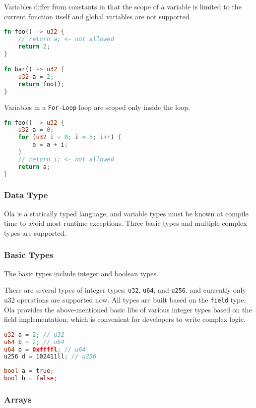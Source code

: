 Variables differ from constants in that the scope of a variable is limited to the current function itself and global variables are not supported.

\begin{lstlisting}[language=rust]
fn foo() -> u32 {
    // return a; <- not allowed
    return 2;
}

fn bar() -> u32 {
    u32 a = 2;
    return foo();
}
\end{lstlisting}

Variables in a \texttt{For-Loop} loop are scoped only inside the loop.

\begin{lstlisting}[language=rust]
fn foo() -> u32 {
    u32 a = 0;
    for (u32 i = 0; i < 5; i++) {
        a = a + i;
    }
    // return i; <- not allowed
    return a;
}
\end{lstlisting}

\subsubsection{Data Type}

Ola is a statically typed language, and variable types must be known at compile time to avoid most runtime exceptions. 
Three basic types and multiple complex types are supported.

\subsubsection*{Basic Types}

The basic types include integer and boolean types.

There are several types of integer types: \texttt{u32}, \texttt{u64}, and \texttt{u256}, and currently only u32 operations are supported now. 
All types are built based on the \texttt{field} type.
Ola provides the above-mentioned basic libs of various integer types based on the field implementation, which is convenient for developers to write complex logic.

\begin{lstlisting}[language=rust]
u32 a = 2; // u32
u64 b = 2; // u64
u64 b = 0xffffl; // u64
u256 d = 102411ll; // u256
\end{lstlisting}

\begin{lstlisting}[language=rust]
bool a = true;
bool b = false;
\end{lstlisting}
\subsubsection*{Arrays}


